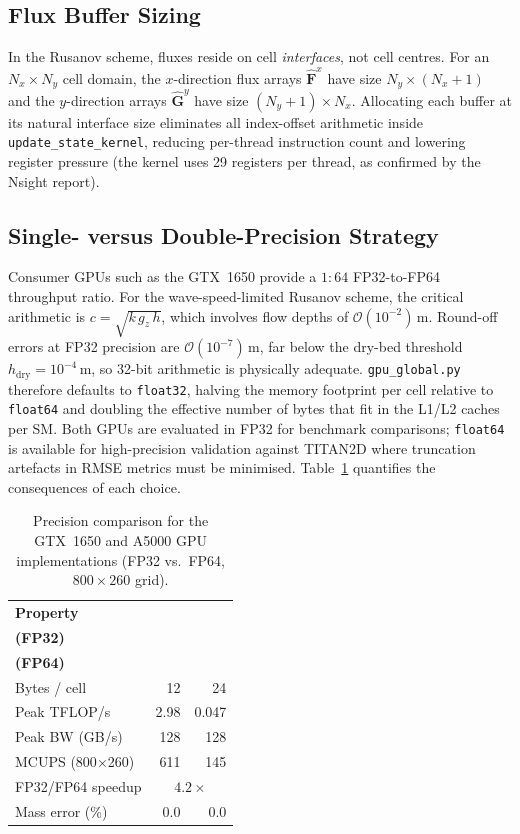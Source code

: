 \documentclass[10pt, conference]{FMFP2023}
\begin{document}
\subsection{Flux Buffer Sizing}

In the Rusanov scheme, fluxes reside on cell
\emph{interfaces}, not cell centres.
For an $N_x\times N_y$ cell domain, the $x$-direction flux
arrays $\hat{\bm{F}}^x$ have size $N_y\times(N_x+1)$
and the $y$-direction arrays $\hat{\bm{G}}^y$ have size
$(N_y+1)\times N_x$.
Allocating each buffer at its natural interface size
eliminates all index-offset arithmetic inside
\texttt{update\_state\_kernel}, reducing per-thread
instruction count and lowering register pressure (the
kernel uses 29 registers per thread, as confirmed by the
Nsight report).

\subsection{Single- versus Double-Precision Strategy}

Consumer GPUs such as the GTX~1650 provide a
$1{:}64$ FP32-to-FP64 throughput ratio.
For the wave-speed-limited Rusanov scheme, the critical
arithmetic is $c=\sqrt{k\,g_z\,h}$, which involves
flow depths of $\mathcal{O}(10^{-2})$\,m.
Round-off errors at FP32 precision are
$\mathcal{O}(10^{-7})$\,m, far below the dry-bed
threshold $h_{\text{dry}}=10^{-4}$\,m, so 32-bit
arithmetic is physically adequate.
\texttt{gpu\_global.py} therefore defaults to
\texttt{float32}, halving the memory footprint per cell
relative to \texttt{float64} and doubling the effective
number of bytes that fit in the L1/L2 caches per SM.
Both GPUs are evaluated in FP32 for benchmark comparisons;
\texttt{float64} is available for high-precision validation
against TITAN2D where truncation artefacts in RMSE metrics
must be minimised.
Table~\ref{tab:precision} quantifies the consequences of
each choice.

\begin{table}[htbp]
\caption{Precision comparison for the GTX~1650 and
A5000 GPU implementations (FP32 vs.\ FP64,
$800\times260$ grid).}
\label{tab:precision}
\centering
\begin{tabular}{@{}p{3.2cm}rr@{}}
\toprule
\textbf{Property}
    & \shortstack[r]{\textbf{GTX~1650}\\\textbf{(FP32)}}
    & \shortstack[r]{\textbf{GTX~1650}\\\textbf{(FP64)}} \\
\midrule
Bytes / cell              & 12    & 24    \\
Peak TFLOP/s              & 2.98  & 0.047 \\
Peak BW (GB/s)            & 128   & 128   \\
MCUPS (800$\times$260)    & 611   & 145   \\
FP32/FP64 speedup         & \multicolumn{2}{c}{$4.2\times$} \\
Mass error (\%)           & 0.0   & 0.0   \\
\bottomrule
\end{tabular}
\end{table}
\end{document}

